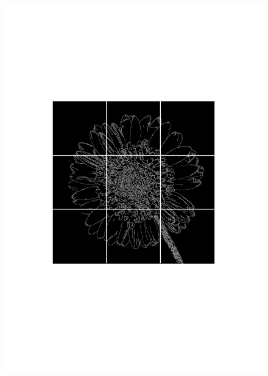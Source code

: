 \begin{figure}
\label{gridImage}
\begin{center}
\includegraphics[scale=0.4]{img/gridEdgesFlower}   
\end{center}
\end{figure}


